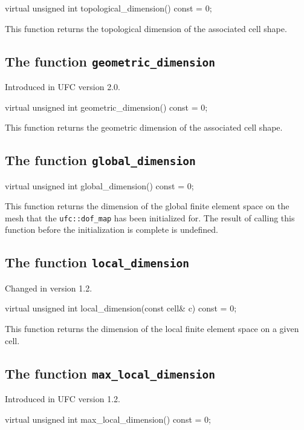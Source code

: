 \begin{code}
virtual unsigned int topological_dimension() const = 0;
\end{code}

This function returns the topological dimension of the associated cell
shape.

\subsection{The function \texttt{geometric\_dimension}}
Introduced in UFC version 2.0.

\begin{code}
virtual unsigned int geometric_dimension() const = 0;
\end{code}

This function returns the geometric dimension of the associated cell
shape.

\subsection{The function \texttt{global\_dimension}}

\begin{code}
virtual unsigned int global_dimension() const = 0;
\end{code}

This function returns the dimension of the global finite element space
on the mesh that the \texttt{ufc::dof\_map} has been initialized
for. The result of calling this function before the initialization is
complete is undefined.

\subsection{The function \texttt{local\_dimension}}
Changed in version 1.2.

\begin{code}
virtual unsigned int local_dimension(const cell& c) const = 0;
\end{code}

This function returns the dimension of the local finite element space
on a given cell.

\subsection{The function \texttt{max\_local\_dimension}}
Introduced in UFC version 1.2.

\begin{code}
virtual unsigned int max_local_dimension() const = 0;
\end{code}

